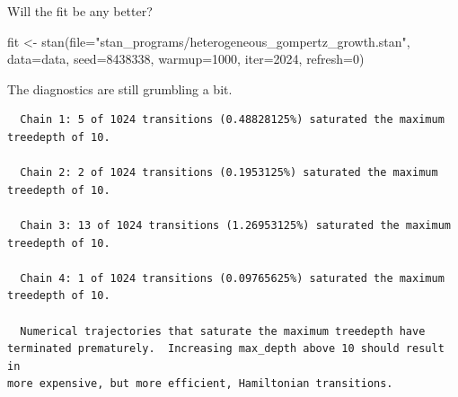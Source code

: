 \documentclass[
  letterpaper,
  DIV=11,
  numbers=noendperiod]{scrartcl}
\newenvironment{Shaded}{\begin{snugshade}}{\end{snugshade}}
\newcommand{\AttributeTok}[1]{\textcolor[rgb]{0.40,0.45,0.13}{#1}}
\newcommand{\DecValTok}[1]{\textcolor[rgb]{0.68,0.00,0.00}{#1}}
\newcommand{\FunctionTok}[1]{\textcolor[rgb]{0.28,0.35,0.67}{#1}}
\newcommand{\NormalTok}[1]{\textcolor[rgb]{0.00,0.23,0.31}{#1}}
\newcommand{\OtherTok}[1]{\textcolor[rgb]{0.00,0.23,0.31}{#1}}
\newcommand{\SpecialCharTok}[1]{\textcolor[rgb]{0.37,0.37,0.37}{#1}}
\newcommand{\StringTok}[1]{\textcolor[rgb]{0.13,0.47,0.30}{#1}}
\begin{document}
Will the fit be any better?

\begin{Shaded}
\begin{Highlighting}[]
\NormalTok{fit }\OtherTok{\textless{}{-}} \FunctionTok{stan}\NormalTok{(}\AttributeTok{file=}\StringTok{"stan\_programs/heterogeneous\_gompertz\_growth.stan"}\NormalTok{,}
            \AttributeTok{data=}\NormalTok{data, }\AttributeTok{seed=}\DecValTok{8438338}\NormalTok{,}
            \AttributeTok{warmup=}\DecValTok{1000}\NormalTok{, }\AttributeTok{iter=}\DecValTok{2024}\NormalTok{, }\AttributeTok{refresh=}\DecValTok{0}\NormalTok{)}
\end{Highlighting}
\end{Shaded}

The diagnostics are still grumbling a bit.

\begin{Shaded}
\end{Shaded}

\begin{verbatim}
  Chain 1: 5 of 1024 transitions (0.48828125%) saturated the maximum treedepth of 10.

  Chain 2: 2 of 1024 transitions (0.1953125%) saturated the maximum treedepth of 10.

  Chain 3: 13 of 1024 transitions (1.26953125%) saturated the maximum treedepth of 10.

  Chain 4: 1 of 1024 transitions (0.09765625%) saturated the maximum treedepth of 10.

  Numerical trajectories that saturate the maximum treedepth have
terminated prematurely.  Increasing max_depth above 10 should result in
more expensive, but more efficient, Hamiltonian transitions.
\end{verbatim}
\end{document}
